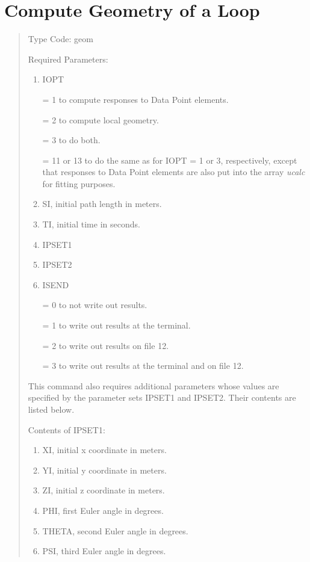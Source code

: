\newpage
\section{Compute Geometry of a Loop}   
\begin{quotation}
\noindent Type Code:  geom
\vspace{5mm}

\noindent Required Parameters:
\begin{enumerate}
\item IOPT

       = 1 to compute responses to Data Point elements.

       = 2 to compute local geometry.

       = 3 to do both.

	   = 11 or 13 to do the same as for IOPT = 1 or 3,
	   respectively, except that \hspace*{1em}responses to Data Point elements are also
	   put into the array {\em ucalc} for \hspace*{1em}fitting purposes.

\item SI, initial path length in meters.
\item TI, initial time in seconds.
\item IPSET1
\item IPSET2
\item ISEND

       = 0 to not write out results.

       = 1 to write out results at the terminal.

       = 2 to write out results on file 12.

       = 3 to write out results at the terminal and on file 12.

\end{enumerate}

\vspace{2mm}
This command also requires additional parameters whose values are
specified by the parameter sets IPSET1 and IPSET2.  Their contents are
listed below.

\vspace{2mm}
Contents of IPSET1:
\begin{enumerate}
\item XI, initial x coordinate in meters.
\item YI, initial y coordinate in meters.
\item ZI, initial z coordinate in meters.
\item PHI, first Euler angle in degrees.
\item THETA, second Euler angle in degrees.
\item PSI, third Euler angle in degrees.
\end{enumerate}


\end{quotation}
